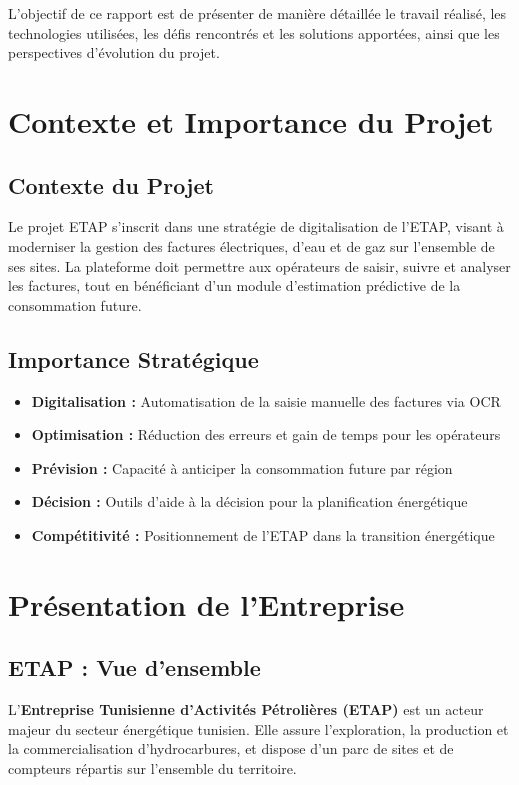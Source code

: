 \documentclass[12pt,a4paper]{article}
\begin{document}
L'objectif de ce rapport est de présenter de manière détaillée le travail réalisé, les technologies utilisées, les défis rencontrés et les solutions apportées, ainsi que les perspectives d'évolution du projet.

\section{Contexte et Importance du Projet}

\subsection{Contexte du Projet}
Le projet ETAP s'inscrit dans une stratégie de digitalisation de l'ETAP, visant à moderniser la gestion des factures électriques, d'eau et de gaz sur l'ensemble de ses sites. La plateforme doit permettre aux opérateurs de saisir, suivre et analyser les factures, tout en bénéficiant d'un module d'estimation prédictive de la consommation future.

\subsection{Importance Stratégique}
\begin{itemize}
    \item \textbf{Digitalisation :} Automatisation de la saisie manuelle des factures via OCR
    \item \textbf{Optimisation :} Réduction des erreurs et gain de temps pour les opérateurs
    \item \textbf{Prévision :} Capacité à anticiper la consommation future par région
    \item \textbf{Décision :} Outils d'aide à la décision pour la planification énergétique
    \item \textbf{Compétitivité :} Positionnement de l'ETAP dans la transition énergétique
\end{itemize}

\section{Présentation de l'Entreprise}

\subsection{ETAP : Vue d'ensemble}
L'\textbf{Entreprise Tunisienne d'Activités Pétrolières (ETAP)} est un acteur majeur du secteur énergétique tunisien. Elle assure l'exploration, la production et la commercialisation d'hydrocarbures, et dispose d'un parc de sites et de compteurs répartis sur l'ensemble du territoire.
\end{document}
